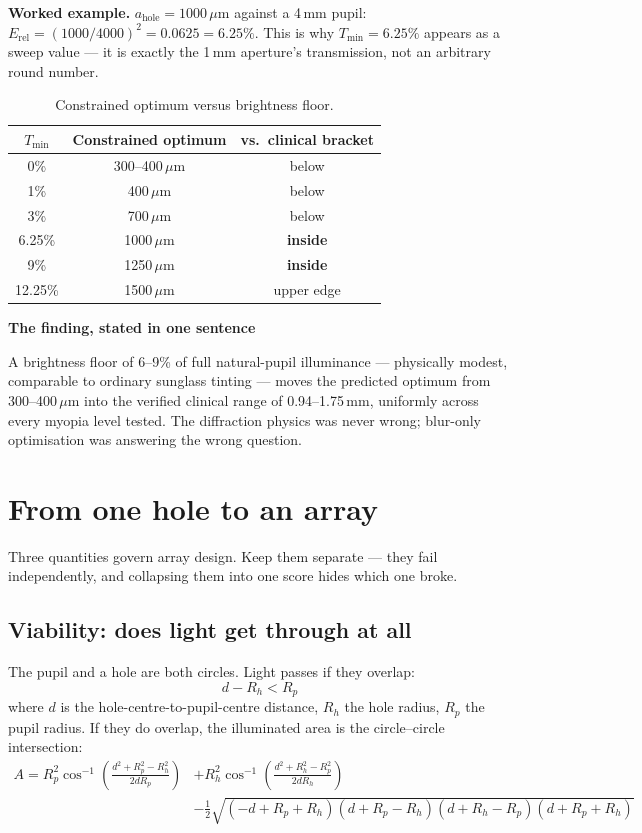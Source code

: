 \documentclass[11pt]{report}
\newenvironment{keybox}[1]%
{\par\vspace{8pt}\begin{lrbox}{\kbsave}\begin{minipage}{0.88\textwidth}%
{\bfseries\color{hbblue}#1}\par\vspace{4pt}\ignorespaces}%
{\end{minipage}\end{lrbox}%
\begin{center}\setlength{\fboxrule}{1.2pt}\setlength{\fboxsep}{8pt}%
\fcolorbox{hbblue}{boxgrey}{\usebox{\kbsave}}\end{center}\vspace{8pt}\par}
\newcommand{\ahole}{a_{\text{hole}}}
\begin{document}
\textbf{Worked example.} $\ahole = 1000\,\mu$m against a 4\,mm pupil:
$E_{\text{rel}} = (1000/4000)^2 = 0.0625 = 6.25\%$. This is why $T_{\min}=6.25\%$ appears as a
sweep value --- it is exactly the 1\,mm aperture's transmission, not an arbitrary round number.

\begin{longtable}{ccc}
\caption{Constrained optimum versus brightness floor.}\\
\toprule
$T_{\min}$ & Constrained optimum & vs.\ clinical bracket \\
\midrule
\endhead
0\% & 300--400\,$\mu$m & below \\
1\% & 400\,$\mu$m & below \\
3\% & 700\,$\mu$m & below \\
6.25\% & 1000\,$\mu$m & \textbf{inside} \\
9\% & 1250\,$\mu$m & \textbf{inside} \\
12.25\% & 1500\,$\mu$m & upper edge \\
\bottomrule
\end{longtable}

\begin{keybox}{The finding, stated in one sentence}
A brightness floor of 6--9\% of full natural-pupil illuminance --- physically modest, comparable
to ordinary sunglass tinting --- moves the predicted optimum from 300--400\,$\mu$m into the
verified clinical range of 0.94--1.75\,mm, uniformly across every myopia level tested. The
diffraction physics was never wrong; blur-only optimisation was answering the wrong question.
\end{keybox}

\chapter{From one hole to an array}

Three quantities govern array design. Keep them separate --- they fail independently, and
collapsing them into one score hides which one broke.

\section{Viability: does light get through at all}

The pupil and a hole are both circles. Light passes if they overlap:
\begin{equation}
d - R_h < R_p
\label{eq:viability}
\end{equation}
where $d$ is the hole-centre-to-pupil-centre distance, $R_h$ the hole radius, $R_p$ the pupil
radius. If they do overlap, the illuminated area is the circle--circle intersection:
\begin{equation}
\begin{split}
A = R_p^2\cos^{-1}\!\left(\frac{d^2+R_p^2-R_h^2}{2dR_p}\right)
  &+ R_h^2\cos^{-1}\!\left(\frac{d^2+R_h^2-R_p^2}{2dR_h}\right)\\
  &- \tfrac12\sqrt{(-d+R_p+R_h)(d+R_p-R_h)(d+R_h-R_p)(d+R_p+R_h)}
\end{split}
\label{eq:overlap}
\end{equation}
\end{document}
